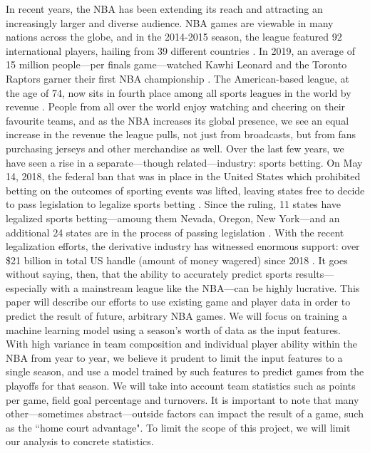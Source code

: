 \documentclass[letterpaper]{article} %
\begin{document}
In recent years, the NBA has been extending its reach and attracting an increasingly larger and diverse audience. NBA games are viewable in many nations across the globe, and in the 2014-2015 season, the league featured 92 international players, hailing from 39 different countries \cite{jones2016predicting}. In 2019, an average of 15 million people---per finals game---watched Kawhi Leonard and the Toronto Raptors garner their first NBA championship \cite{gough_2019}. The American-based league, at the age of 74, now sits in fourth place among all sports leagues in the world by revenue \cite{amoros_2016}. People from all over the world enjoy watching and cheering on their favourite teams, and as the NBA increases its global presence, we see an equal increase in the revenue the league pulls, not just from broadcasts, but from fans purchasing jerseys and other merchandise as well. Over the last few years, we have seen a rise in a separate---though related---industry: sports betting. On May 14, 2018, the federal ban that was in place in the United States which prohibited betting on the outcomes of sporting events was lifted, leaving states free to decide to pass legislation to legalize sports betting \cite{licata_2019}. Since the ruling, 11 states have legalized sports betting---amoung them Nevada, Oregon, New York---and an additional 24 states are in the process of passing legislation \cite{licata_2019}. With the recent legalization efforts, the derivative industry has witnessed enormous support: over \$21 billion in total US handle (amount of money wagered) since 2018 \cite{legal_sports_report}. It goes without saying, then, that the ability to accurately predict sports results---especially with a mainstream league like the NBA---can be highly lucrative. This paper will describe our efforts to use existing game and player data in order to predict the result of future, arbitrary NBA games. We will focus on training a machine learning model using a season's worth of data as the input features. With high variance in team composition and individual player ability within the NBA from year to year, we believe it prudent to limit the input features to a single season, and use a model trained by such features to predict games from the playoffs for that season. We will take into account team statistics such as points per game, field goal percentage and turnovers. It is important to note that many other---sometimes abstract---outside factors can impact the result of a game, such as the ``home court advantage". To limit the scope of this project, we will limit our analysis to concrete statistics.
\end{document}
